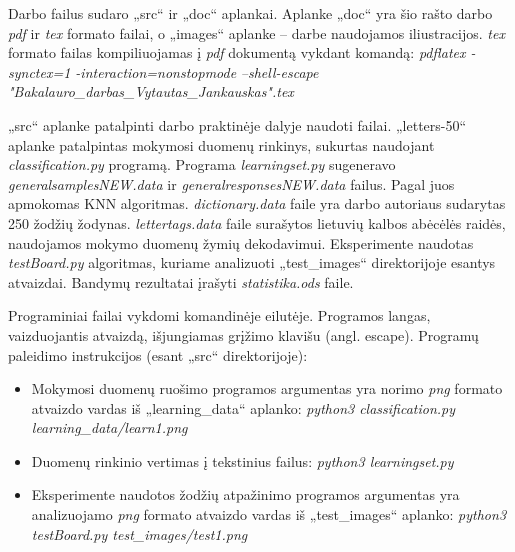 \documentclass[a4paper,12pt]{article}
\begin{document}
Darbo failus sudaro „src“ ir „doc“ aplankai. Aplanke „doc“ yra šio rašto darbo \textit{pdf} ir \textit{tex} formato failai, o „images“ aplanke – darbe naudojamos iliustracijos. \textit{tex} formato failas kompiliuojamas į \textit{pdf} dokumentą vykdant komandą:\newline
\textit{pdflatex -synctex=1 -interaction=nonstopmode} \newline
\textit{--shell-escape "Bakalauro\_darbas\_Vytautas\_Jankauskas".tex}

„src“ aplanke patalpinti darbo praktinėje dalyje naudoti failai. „letters-50“ aplanke patalpintas mokymosi duomenų rinkinys, sukurtas naudojant \textit{classification.py} programą. Programa \textit{learningset.py} sugeneravo \textit{generalsamplesNEW.data} ir \textit{generalresponsesNEW.data} failus. Pagal juos apmokomas KNN algoritmas. \textit{dictionary.data} faile yra darbo autoriaus sudarytas 250 žodžių žodynas. \textit{lettertags.data} faile surašytos lietuvių kalbos abėcėlės raidės, naudojamos mokymo duomenų žymių dekodavimui. Eksperimente naudotas \textit{testBoard.py} algoritmas, kuriame analizuoti „test\_images“ direktorijoje esantys atvaizdai. Bandymų rezultatai įrašyti \textit{statistika.ods} faile.

Programiniai failai vykdomi komandinėje eilutėje. Programos langas, vaizduojantis atvaizdą, išjungiamas grįžimo klavišu (angl. escape). Programų paleidimo instrukcijos (esant „src“ direktorijoje):
\begin{itemize}
	\item Mokymosi duomenų ruošimo programos argumentas yra norimo \textit{png} formato atvaizdo vardas iš „learning\_data“ aplanko: \newline
	\textit{python3 classification.py learning\_data/learn1.png}
	\item Duomenų rinkinio vertimas į tekstinius failus: \newline
	\textit{python3 learningset.py}
	\item Eksperimente naudotos žodžių atpažinimo programos argumentas yra analizuojamo \textit{png} formato atvaizdo vardas iš „test\_images“ aplanko: \newline
	\textit{python3 testBoard.py test\_images/test1.png}
\end{itemize}
\end{document}
